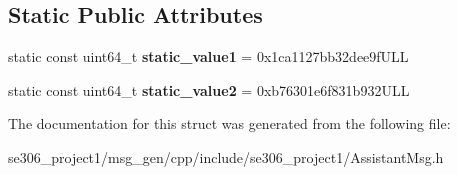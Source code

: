 \subsection*{Static Public Attributes}
\begin{DoxyCompactItemize}
\item 
\hypertarget{structros_1_1message__traits_1_1MD5Sum_3_01_1_1se306__project1_1_1AssistantMsg___3_01ContainerAllocator_01_4_01_4_a2fe2af80ffa1a7473555eecfa65f5bdb}{static const uint64\-\_\-t {\bfseries static\-\_\-value1} = 0x1ca1127bb32dee9f\-U\-L\-L}\label{structros_1_1message__traits_1_1MD5Sum_3_01_1_1se306__project1_1_1AssistantMsg___3_01ContainerAllocator_01_4_01_4_a2fe2af80ffa1a7473555eecfa65f5bdb}

\item 
\hypertarget{structros_1_1message__traits_1_1MD5Sum_3_01_1_1se306__project1_1_1AssistantMsg___3_01ContainerAllocator_01_4_01_4_ae6d40a1d0327b6d042044884fb350544}{static const uint64\-\_\-t {\bfseries static\-\_\-value2} = 0xb76301e6f831b932\-U\-L\-L}\label{structros_1_1message__traits_1_1MD5Sum_3_01_1_1se306__project1_1_1AssistantMsg___3_01ContainerAllocator_01_4_01_4_ae6d40a1d0327b6d042044884fb350544}

\end{DoxyCompactItemize}


The documentation for this struct was generated from the following file\-:\begin{DoxyCompactItemize}
\item 
se306\-\_\-project1/msg\-\_\-gen/cpp/include/se306\-\_\-project1/Assistant\-Msg.\-h\end{DoxyCompactItemize}
